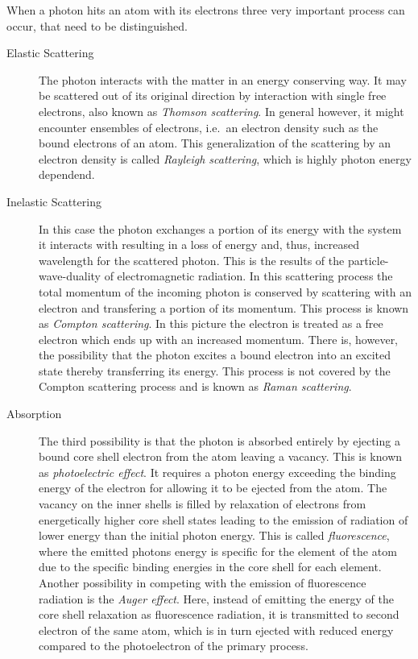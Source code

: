 When a photon hits an atom with its electrons three very important process can occur, that need to be distinguished.
\begin{description}
       \item[Elastic Scattering]
          {The photon interacts with the matter in an energy conserving way. It may be scattered out of its original direction by interaction with single free electrons, also known as \emph{Thomson scattering}. In general however, it might encounter ensembles of electrons, i.e.~an electron density such as the bound electrons of an atom. This generalization of the scattering by an electron density is called \emph{Rayleigh scattering}, which is highly photon energy dependend.}
       \item[Inelastic Scattering]
          {In this case the photon exchanges a portion of its energy with the system it interacts with resulting in a loss of energy and, thus, increased wavelength for the scattered photon. This is the results of the particle-wave-duality of electromagnetic radiation. In this scattering process the total momentum of the incoming photon is conserved by scattering with an electron and transfering a portion of its momentum. This process is known as \emph{Compton scattering}. In this picture the electron is treated as a free electron which ends up with an increased momentum. There is, however, the possibility that the photon excites a bound electron into an excited state thereby transferring its energy. This process is not covered by the Compton scattering process and is known as \emph{Raman scattering}.}
       \item[Absorption]
          {The third possibility is that the photon is absorbed entirely by ejecting a bound core shell electron from the atom leaving a vacancy. This is known as \emph{photoelectric effect}. It requires a photon energy exceeding the binding energy of the electron for allowing it to be ejected from the atom. The vacancy on the inner shells is filled by relaxation of electrons from energetically higher core shell states leading to the emission of radiation of lower energy than the initial photon energy. This is called \emph{fluorescence}, where the emitted photons energy is specific for the element of the atom due to the specific binding energies in the core shell for each element. Another possibility in competing with the emission of fluorescence radiation is the \emph{Auger effect}. Here, instead of emitting the energy of the core shell relaxation as fluorescence radiation, it is transmitted to second electron of the same atom, which is in turn ejected with reduced energy compared to the photoelectron of the primary process.}
\end{description}


